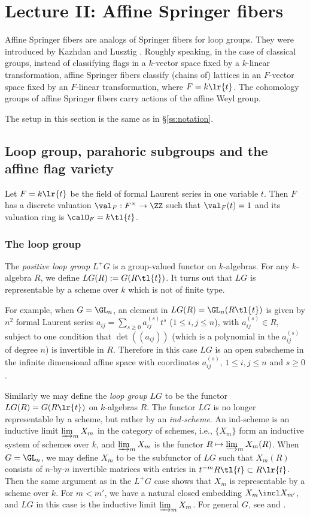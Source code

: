 \section{Lecture II: Affine Springer fibers}\label{s:ASF}

Affine Springer fibers are analogs of Springer fibers for loop groups. They were introduced by Kazhdan and Lusztig \cite{KL}. Roughly speaking, in the case of classical groups, instead of classifying flags in a $k$-vector space fixed by a $k$-linear transformation, affine Springer fibers classify (chains of) lattices in an $F$-vector space fixed by an $F$-linear transformation, where $F=k\lr{t}$. The cohomology groups of affine Springer fibers carry actions of the affine Weyl group.

The setup in this section is the same as in \S\ref{ss:notation}.

\subsection{Loop group, parahoric subgroups and the affine flag variety}
Let $F=k\lr{t}$ be the field of formal Laurent series in one variable $t$.  Then $F$ has a discrete valuation $\val_{F}:F^{\times}\to\ZZ$ such that $\val_{F}(t)=1$ and its valuation ring is $\calO_{F}=k\tl{t}$.

\subsubsection{The loop group} The {\em positive loop group} $L^{+}G$ is a group-valued functor on $k$-algebras. For any $k$-algebra $R$, we define $LG(R):=G(R\tl{t})$. It turns out that $LG$ is representable by a scheme over $k$ which is not of finite type. 

For example, when $G=\GL_{n}$, an element in $LG(R)=\GL_{n}(R\tl{t})$ is given by $n^{2}$ formal Laurent series $a_{ij}=\sum_{s\geq 0}a^{(s)}_{ij}t^{s}$ ($1\leq i,j\leq n$), with $a^{(s)}_{ij}\in R$, subject to one condition that $\det((a_{ij}))$ (which is a polynomial in the $a^{(s)}_{ij}$ of degree $n$) is invertible in $R$. Therefore in this case $LG$ is an open subscheme in the infinite dimensional affine space with coordinates $a^{(s)}_{ij}$, $1\leq i,j\leq n$ and $s\geq 0$. 

Similarly we may define the {\em loop group} $LG$ to be the functor $LG(R)=G(R\lr{t})$ on $k$-algebras $R$. The functor $LG$ is no longer representable by a scheme, but rather by an {\em ind-scheme}. An ind-scheme is an inductive limit $\varinjlim_{m} X_{m}$ in the category of schemes, i.e., $\{X_{m}\}$ form an inductive system of schemes over $k$, and $\varinjlim_{m} X_{m}$ is the functor $R\mapsto \varinjlim_{m} X_{m}(R)$.  When $G=\GL_{n}$, we may  define $X_{m}$ to be the subfunctor of $LG$ such that $X_{m}(R)$ consists of $n$-by-$n$ invertible matrices with entries in $t^{-m}R\tl{t}\subset R\lr{t}$. Then the same argument as in the  $L^{+}G$ case shows that $X_{m}$ is representable by a scheme over $k$. For $m<m'$, we have a natural closed embedding $X_{m}\incl X_{m'}$, and $LG$ in this case is the inductive limit $\varinjlim_{m}X_{m}$.  For general $G$, see \cite[\S1]{BL} and \cite[\S2]{Faltings}.


